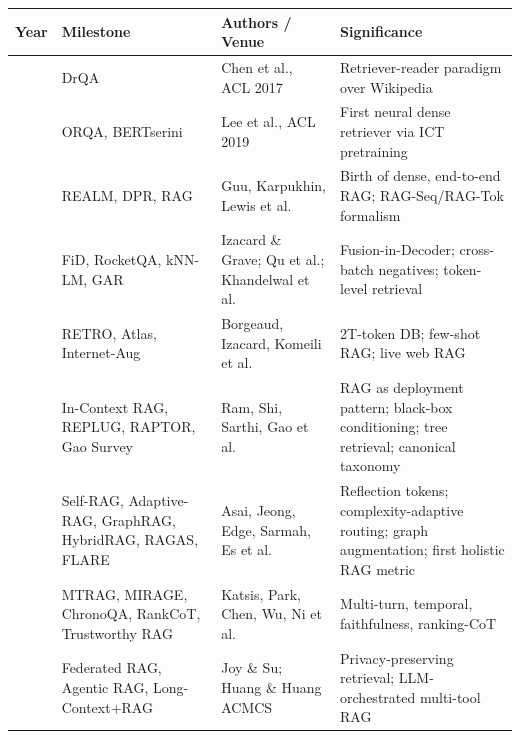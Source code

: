 {\def\LTcaptype{none} %
\begin{longtable}[]{@{}
  >{\raggedright\arraybackslash}p{}
  >{\raggedright\arraybackslash}p{}
  >{\raggedright\arraybackslash}p{}
  >{\raggedright\arraybackslash}p{}@{}}
\toprule\noalign{}
\begin{minipage}[b]{\linewidth}\raggedright
Year
\end{minipage} & \begin{minipage}[b]{\linewidth}\raggedright
Milestone
\end{minipage} & \begin{minipage}[b]{\linewidth}\raggedright
Authors / Venue
\end{minipage} & \begin{minipage}[b]{\linewidth}\raggedright
Significance
\end{minipage} \\
\midrule\noalign{}
\endhead
\bottomrule\noalign{}
\endlastfoot
2017 & DrQA & Chen et al., ACL 2017 & Retriever-reader paradigm over Wikipedia \\
2019 & ORQA, BERTserini & Lee et al., ACL 2019 & First neural dense retriever via ICT pretraining \\
2020 & REALM, DPR, RAG & Guu, Karpukhin, Lewis et al. & Birth of dense, end-to-end RAG; RAG-Seq/RAG-Tok formalism \\
2021 & FiD, RocketQA, kNN-LM, GAR & Izacard \& Grave; Qu et al.; Khandelwal et al. & Fusion-in-Decoder; cross-batch negatives; token-level retrieval \\
2022 & RETRO, Atlas, Internet-Aug & Borgeaud, Izacard, Komeili et al. & 2T-token DB; few-shot RAG; live web RAG \\
2023 & In-Context RAG, REPLUG, RAPTOR, Gao Survey & Ram, Shi, Sarthi, Gao et al. & RAG as deployment pattern; black-box conditioning; tree retrieval; canonical taxonomy \\
2024 & Self-RAG, Adaptive-RAG, GraphRAG, HybridRAG, RAGAS, FLARE & Asai, Jeong, Edge, Sarmah, Es et al. & Reflection tokens; complexity-adaptive routing; graph augmentation; first holistic RAG metric \\
2025 & MTRAG, MIRAGE, ChronoQA, RankCoT, Trustworthy RAG & Katsis, Park, Chen, Wu, Ni et al. & Multi-turn, temporal, faithfulness, ranking-CoT \\
2026 & Federated RAG, Agentic RAG, Long-Context+RAG & Joy \& Su; Huang \& Huang ACMCS & Privacy-preserving retrieval; LLM-orchestrated multi-tool RAG \\
\end{longtable}
}


